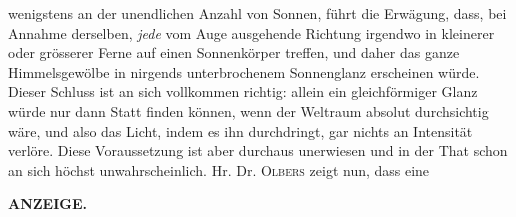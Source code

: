 wenigstens an der unendlichen Anzahl von Sonnen, führt die Erwägung, dass, bei Annahme derselben, \emph{jede} vom Auge ausgehende Richtung irgendwo in kleinerer oder grösserer Ferne auf einen Sonnenkörper treffen, und daher das ganze Himmelsgewölbe in nirgends unterbrochenem Sonnenglanz erscheinen würde. Dieser Schluss ist an sich vollkommen richtig: allein ein gleichförmiger Glanz würde nur dann Statt finden können, wenn der Weltraum absolut durchsichtig wäre, und also das Licht, indem es ihn durchdringt, gar nichts an Intensität verlöre. Diese Voraussetzung ist aber durchaus unerwiesen und in der That schon an sich höchst unwahrscheinlich. Hr. Dr. \textsc{Olbers} zeigt nun, dass eine\par
\clearpage
\thispagestyle{empty}
\noindent{}%
%
\parbox[t]{\dimexpr\linewidth-24mm\relax}{\centering\footnotesize\bfseries ANZEIGE.\par}%
\makebox[12mm][r]{}\par\medskip
